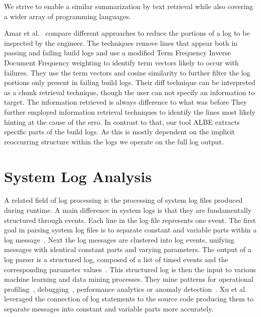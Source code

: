 \documentclass[\myrootdir/main.tex]{subfiles}
\begin{document}
We strive to enable a similar summarization by text retrieval while also covering a wider array of programming languages.

Amar et al.~\cite{amar2019mining}  compare different approaches to reduce the portions of a log to be inspected by the engineer.
The techniques remove lines that appear both in passing and failing build logs and use a modified Term Frequency Inverse Document Frequency weighting to identify term vectors likely to occur with failures.
They use the term vectors and cosine similarity to further filter the log portions only present in failing build logs.
Their diff technique can be interpreted as a chunk retrieval technique, though the user can not specify an information to target.
The information retrieved is always difference to what was before 
They further employed information retrieval techniques to identify the lines most likely hinting at the cause of the erro.
In contrast to that, our tool ALBE extracts specific parts of the build logs.
As this is mostly dependent on the implicit reoccurring structure within the logs we operate on the full log output.

\section{System Log Analysis} 

A related field of log processing is the processing of system log files produced during runtime.
A main difference in system logs is that they are fundamentally structured through events.
Each line in the log file represents one event.
The first goal in parsing system log files is to separate constant and variable parts within a log message~\cite{nagappan2010abstracting,he2017towards}.
Next the log messages are clustered into log events, unifying messages with identical constant parts and varying parameters.
The output of a log parser is a structured log, composed of a list of timed events and the corresponding parameter values~\cite{he2016evaluation}.
This structured log is then the input to various machine learning and data mining processes.
They mine patterns for operational profiling~\cite{nagappan2009efficiently}, debugging~\cite{oliner2012advances}, performance analytics or anomaly detection~\cite{nagappan2010abstracting}.
Xu et al.~\cite{xu2009detecting} leveraged the connection of log statements to the source code producing them to separate messages into constant and variable parts more accurately.
\end{document}
